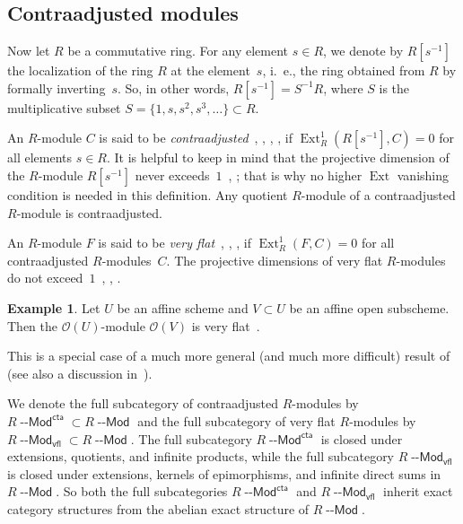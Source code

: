 \documentclass[12pt,a4paper]{amsart}
\newcommand{\+}{\nobreakdash-}
\renewcommand{\:}{\colon}
\DeclareMathOperator{\Ext}{Ext}
\newcommand{\Modl}{{\operatorname{\mathsf{--Mod}}}}
\newcommand{\vfl}{\mathsf{vfl}}
\newcommand{\cta}{\mathsf{cta}}
\newcommand{\cO}{\mathcal O}
\theoremstyle{plain}
\theoremstyle{definition}
\newtheorem{ex}[thm]{Example}
\begin{document}
\subsection{Contraadjusted modules}
 Now let $R$ be a commutative ring.
 For any element $s\in R$, we denote by $R[s^{-1}]$ the localization
of the ring $R$ at the element~$s$, i.~e., the ring obtained from $R$
by formally inverting~$s$.
 So, in other words, $R[s^{-1}]=S^{-1}R$, where $S$ is
the multiplicative subset $S=\{1,s,s^2,s^3,\dotsc\}\subset R$.

 An $R$\+module $C$ is said to be
\emph{contraadjusted}~\cite[Section~1.1]{Pcosh}, \cite[Sections~2
and~5]{ST}, \cite[Sections~2 and~8]{Pcta}, \cite[Section~4.3]{Pphil},
\cite[Section~2]{Pal} if $\Ext^1_R(R[s^{-1}],C)=0$ for all
elements $s\in R$.
 It is helpful to keep in mind that the projective dimension of
the $R$\+module $R[s^{-1}]$ never exceeds~$1$ \,\cite[proof of
Lemma~2.2]{ST}, \cite[proof of Lemma~2.1]{Pcta}; that is why no
higher $\Ext$ vanishing condition is needed in this definition.
 Any quotient $R$\+module of a contraadjusted $R$\+module is
contraadjusted.

 An $R$\+module $F$ is said to be \emph{very
flat}~\cite[Section~1.1]{Pcosh}, \cite[Section~2]{ST},
\cite[Section~0.5]{PSl1}, \cite[Section~4.3]{Pphil}
if $\Ext^1_R(F,C)=0$ for all contraadjusted $R$\+modules~$C$.
 The projective dimensions of very flat $R$\+modules do not
exceed~$1$ \,\cite[Section~1.1]{Pcosh}, \cite[Lemma~2.2]{ST},
\cite[Theorem~4.5(d)]{Pphil}.

\begin{ex} \label{open-affine-very-flat-example}
 Let $U$ be an affine scheme and $V\subset U$ be an affine open
subscheme.
 Then the $\cO(U)$\+module $\cO(V)$ is very
flat~\cite[Lemma~1.2.4]{Pcosh}.

 This is a special case of a much more general (and much more
difficult) result of~\cite[Main Theorem~1.1]{PSl1}
(see also a discussion in~\cite[Remark~5.1]{Pphil}).
\end{ex}

 We denote the full subcategory of contraadjusted $R$\+modules by
$R\Modl^\cta\subset R\Modl$ and the full subcategory of very flat
$R$\+modules by $R\Modl_\vfl\subset R\Modl$.
 The full subcategory $R\Modl^\cta$ is closed under extensions,
quotients, and infinite products, while the full subcategory
$R\Modl_\vfl$ is closed under extensions, kernels of epimorphisms,
and infinite direct sums in $R\Modl$.
 So both the full subcategories $R\Modl^\cta$ and $R\Modl_\vfl$
inherit exact category structures from the abelian exact structure
of $R\Modl$.
\end{document}
